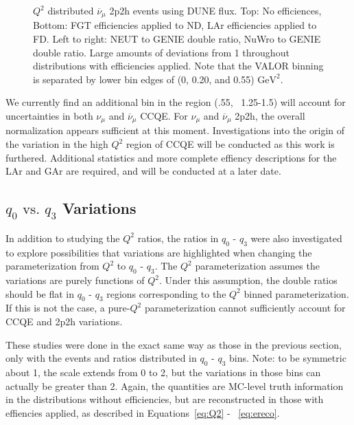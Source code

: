 \documentclass[12pt]{article}
\begin{document}
\begin{figure}[h]
\endminipage
\caption{$Q^2$ distributed $\overline{\nu}_{\mu}$ 2p2h events using DUNE flux. Top: No efficiences, Bottom: FGT efficiencies applied to ND, LAr efficiencies applied to FD. Left to right: NEUT to GENIE double ratio, NuWro to GENIE double ratio. Large amounts of deviations from 1 throughout distributions with efficiencies applied. Note that the VALOR binning is separated by lower bin edges of (0, 0.20, and 0.55) $\textrm{GeV}^2$.}
\label{fig:Q2_2p2h_numubar_no_eff}
\end{figure}
\FloatBarrier

We currently find an additional bin in the region (.55, ~1.25-1.5) will account for uncertainties in both $\nu_{\mu}$ and $\overline{\nu}_{\mu}$ CCQE. For $\nu_{\mu}$ and $\overline{\nu}_{\mu}$ 2p2h, the overall normalization appears sufficient at this moment. Investigations into the origin of the variation in the high $Q^2$ region of CCQE will be conducted as this work is furthered. Additional statistics and more complete effiency descriptions for the LAr and GAr are required, and will be conducted at a later date.

\subsection{$q_0 \textrm{ vs. } q_3$ Variations}
\label{subsec:q0q3}
In addition to studying the $Q^2$ ratios, the ratios in $q_0 \textrm{ - } q_3$ were also investigated to explore possibilities that variations are highlighted when changing the parameterization from $Q^2$ to $q_0 \textrm{ - } q_3$. The $Q^2$ parameterization assumes the variations are purely functions of $Q^2$. Under this assumption, the double ratios should be flat in $q_0 \textrm{ - } q_3$ regions corresponding to the $Q^2$ binned parameterization. If this is not the case, a pure-$Q^2$ parameterization cannot sufficiently account for CCQE and 2p2h variations. 

These studies were done in the exact same way as those in the previous section, only with the events and ratios distributed in $q_0 \textrm{ - } q_3$ bins. Note: to be symmetric about 1, the scale extends from 0 to 2, but the variations in those bins can actually be greater than 2. Again, the quantities are MC-level truth information in the distributions without efficiencies, but are reconstructed in those with effiencies applied, as described in Equations~\ref{eq:Q2} - ~\ref{eq:ereco}.
\end{document}
